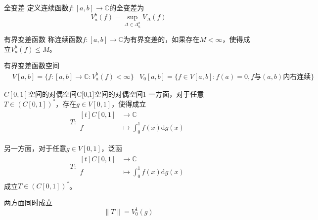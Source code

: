 \documentclass[lang = cn, scheme = chinese, thmcnt = section]{elegantbook}
\newcommand{\C}{\mathbb{C}}  		   %
\begin{document}
\begin{definition}{全变差}
	定义连续函数$f:[a,b]\to \C$的全变差为
	$$
	V_a^b(f)=\sup_{\Delta\in \Delta_a^b}V_{\Delta}(f)
	$$
\end{definition}

\begin{definition}{有界变差函数}
	称连续函数$f:[a,b]\to \C$为有界变差的，如果存在$M<\infty$，使得成立$V_a^b(f)\le M$。
\end{definition}

\begin{definition}{有界变差函数空间}
	\begin{align*}
		& V[a,b]=\{ f:[a,b]\to \C:V_a^b(f)<\infty \}
		& V_0[a,b]=\{ f\in V[a,b]:f(a)=0,f\text{与}(a,b)\text{内右连续} \}
	\end{align*}
\end{definition}

\begin{theorem}{$C[0,1]$空间的对偶空间}{C[0,1]空间的对偶空间1}
	一方面，对于任意$T\in (C[0,1])^*$，存在$g\in V[0,1]$，使得成立
	\begin{align*}
		T:\begin{aligned}[t]
			C[0,1]&\longrightarrow \C\\
			f&\longmapsto \int_0^1 f(x)\mathrm{d}g(x)
		\end{aligned}
	\end{align*}

	另一方面，对于任意$g\in V[0,1]$，泛函
	\begin{align*}
		T:\begin{aligned}[t]
			C[0,1]&\longrightarrow \C\\
			f&\longmapsto \int_0^1 f(x)\mathrm{d}g(x)
		\end{aligned}
	\end{align*}
	成立$T\in (C[0,1])^*$。
	
	两方面同时成立
	$$
	\|T\|=V_0^1(g)
	$$
\end{theorem}
\end{document}
